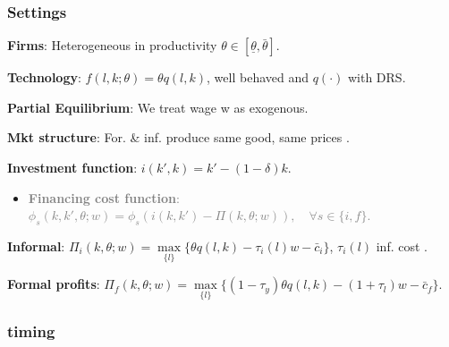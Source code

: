 \documentclass[aspectratio=169]{beamer}
\begin{document}
\begin{frame}
\frametitle{Settings}\label{settings}


\textbf{Firms}: Heterogeneous in productivity $\theta \in [\underline{\theta}, \bar{\theta}]$. 

\vspace{4mm}
\pause

\textbf{Technology}: $f(l,k; \theta) = \theta q(l,k)$, well behaved and $q(\cdot)$ with DRS. 

\vspace{4mm}
\pause

\textbf{Partial Equilibrium}: We treat wage w as exogenous.

\vspace{4mm}
\pause

\textbf{Mkt structure}: For. \& inf. produce same good, same prices \textcolor{lightgray}{\citep{imbert2023rural}}.


\vspace{4mm}
\pause
    
\textbf{Investment function}: $i(k',k) = k' - (1 - \delta) k$.

\begin{itemize}
    \item \textcolor{gray}{\textbf{Financing cost function}: $\phi_s(k,k',\theta;w) = \phi_s(i(k, k') - \Pi(k,\theta;w)), \quad \forall s \in \{i,f\}$.}
\end{itemize}

\vspace{4mm}
\pause


\textbf{Informal}: $\Pi_i(k,\theta;w) = \max \limits_{\{l\}} \{ \theta q(l,k) - \tau_i(l) w - \bar{c}_i \}$, $\tau_i(l)$ inf. cost \textcolor{lightgray}{\citep{ulyssea2018firms}}.

\vspace{4mm}
\pause

\textbf{Formal profits}: $\Pi_f(k,\theta;w) = \max \limits_{\{l\}} \{ (1 - \tau_y) \theta q(l,k) - (1 + \tau_l) w - \bar{c}_f \}$. 

\end{frame}


\begin{frame}
\frametitle{timing}

\begin{figure}[h!] 
    \begin{center}
        
    \end{center}
\end{figure}

\end{frame}
\end{document}
